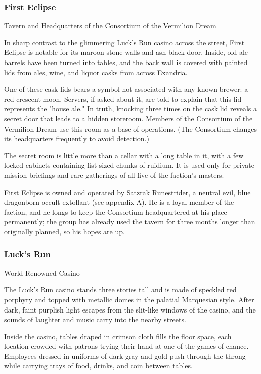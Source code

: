 \documentclass[10pt,a4paper,twoside,bg=print,twocolumn,openany,nodeprecatedcode]{dndbook}
\begin{document}
\subsubsection{First Eclipse}
Tavern and Headquarters of the Consortium of the Vermilion Dream

In sharp contrast to the glimmering Luck's Run casino across the street, First Eclipse is notable for its maroon stone walls and ash-black door. Inside, old ale barrels have been turned into tables, and the back wall is covered with painted lids from ales, wine, and liquor casks from across Exandria.

One of these cask lids bears a symbol not associated with any known brewer: a red crescent moon. Servers, if asked about it, are told to explain that this lid represents the "house ale." In truth, knocking three times on the cask lid reveals a secret door that leads to a hidden storeroom. Members of the Consortium of the Vermilion Dream use this room as a base of operations. (The Consortium changes its headquarters frequently to avoid detection.)

The secret room is little more than a cellar with a long table in it, with a few locked cabinets containing fist-sized chunks of ruidium. It is used only for private mission briefings and rare gatherings of all five of the faction's masters.

First Eclipse is owned and operated by Satzrak Runestrider, a neutral evil, blue dragonborn occult extollant (see appendix A). He is a loyal member of the faction, and he longs to keep the Consortium headquartered at his place permanently; the group has already used the tavern for three months longer than originally planned, so his hopes are up.

\subsubsection{Luck's Run}
World-Renowned Casino

The Luck's Run casino stands three stories tall and is made of speckled red porphyry and topped with metallic domes in the palatial Marquesian style. After dark, faint purplish light escapes from the slit-like windows of the casino, and the sounds of laughter and music carry into the nearby streets.

Inside the casino, tables draped in crimson cloth fills the floor space, each location crowded with patrons trying their hand at one of the games of chance. Employees dressed in uniforms of dark gray and gold push through the throng while carrying trays of food, drinks, and coin between tables.
\end{document}
